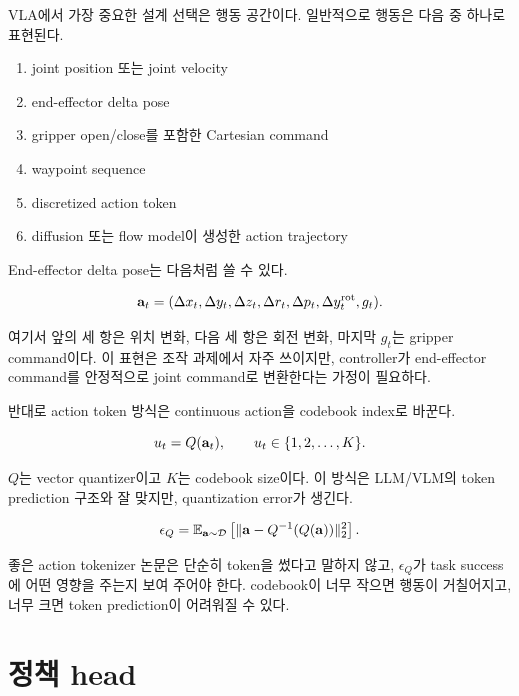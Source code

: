 VLA에서 가장 중요한 설계 선택은 행동 공간이다. 일반적으로 행동은 다음 중 하나로 표현된다.

\begin{enumerate}
  \item joint position 또는 joint velocity
  \item end-effector delta pose
  \item gripper open/close를 포함한 Cartesian command
  \item waypoint sequence
  \item discretized action token
  \item diffusion 또는 flow model이 생성한 action trajectory
\end{enumerate}

End-effector delta pose는 다음처럼 쓸 수 있다.

\begin{equation}
  \mathbf{a}_t =
  (\Delta x_t, \Delta y_t, \Delta z_t,
   \Delta r_t, \Delta p_t, \Delta y_t^{\mathrm{rot}}, g_t).
  \label{eq:ee_action}
\end{equation}

여기서 앞의 세 항은 위치 변화, 다음 세 항은 회전 변화, 마지막 $g_t$는 gripper command이다. 이 표현은 조작 과제에서 자주 쓰이지만, controller가 end-effector command를 안정적으로 joint command로 변환한다는 가정이 필요하다.

반대로 action token 방식은 continuous action을 codebook index로 바꾼다.

\begin{equation}
  u_t = Q(\mathbf{a}_t), \qquad u_t \in \{1,2,\ldots,K\}.
  \label{eq:action_token}
\end{equation}

$Q$는 vector quantizer이고 $K$는 codebook size이다. 이 방식은 LLM/VLM의 token prediction 구조와 잘 맞지만, quantization error가 생긴다.

\begin{equation}
  \epsilon_Q
  =
  \mathbb{E}_{\mathbf{a} \sim \mathcal{D}}
  \left[
    \lVert \mathbf{a} - Q^{-1}(Q(\mathbf{a})) \rVert_2^2
  \right].
  \label{eq:quantization_error}
\end{equation}

좋은 action tokenizer 논문은 단순히 token을 썼다고 말하지 않고, $\epsilon_Q$가 task success에 어떤 영향을 주는지 보여 주어야 한다. codebook이 너무 작으면 행동이 거칠어지고, 너무 크면 token prediction이 어려워질 수 있다.

\section{정책 head}

